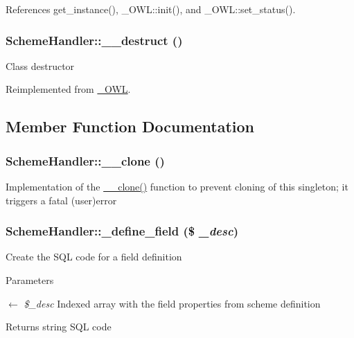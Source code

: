 References get\_\-instance(), \_\-OWL::init(), and \_\-OWL::set\_\-status().

\subsubsection[{\_\-\_\-destruct}]{\setlength{\rightskip}{0pt plus 5cm}SchemeHandler::\_\-\_\-destruct ()}\label{classSchemeHandler_a3d786efe6ef92858de21438b59774226}
Class destructor 

Reimplemented from \hyperlink{class__OWL_a44fd2222476a3109286cc82d92b6bbcc}{\_\-OWL}.



\subsection{Member Function Documentation}
\subsubsection[{\_\-\_\-clone}]{\setlength{\rightskip}{0pt plus 5cm}SchemeHandler::\_\-\_\-clone ()}\label{classSchemeHandler_af0a48894ea6bb36f3149ccd40bf37681}
Implementation of the \hyperlink{classSchemeHandler_af0a48894ea6bb36f3149ccd40bf37681}{\_\-\_\-clone()} function to prevent cloning of this singleton; it triggers a fatal (user)error 
\subsubsection[{\_\-define\_\-field}]{\setlength{\rightskip}{0pt plus 5cm}SchemeHandler::\_\-define\_\-field (\$ {\em \_\-desc})}\label{classSchemeHandler_a223d509509598fbc99741e910bda8cac}
Create the SQL code for a field definition 
\begin{DoxyParams}{Parameters}
\item[\mbox{$\leftarrow$} {\em \$\_\-desc}]Indexed array with the field properties from scheme definition\end{DoxyParams}
\begin{DoxyReturn}{Returns}
string SQL code 
\end{DoxyReturn}


